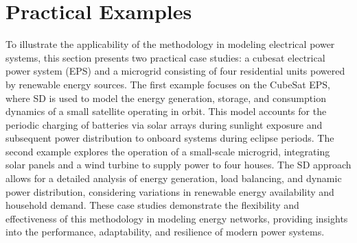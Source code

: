 \documentclass[11pt, a4paper]{article}
\theoremstyle{definition}
\theoremstyle{plain}
\theoremstyle{plain}
\theoremstyle{remark}
\theoremstyle{remark}
\theoremstyle{remark}
\begin{document}
\section{Practical Examples}

To illustrate the applicability of the methodology in modeling electrical power systems, this section presents two practical case studies: a cubesat electrical power system (EPS) and a microgrid consisting of four residential units powered by renewable energy sources. The first example focuses on the CubeSat EPS, where SD is used to model the energy generation, storage, and consumption dynamics of a small satellite operating in orbit. This model accounts for the periodic charging of batteries via solar arrays during sunlight exposure and subsequent power distribution to onboard systems during eclipse periods. The second example explores the operation of a small-scale microgrid, integrating solar panels and a wind turbine to supply power to four houses. The SD approach allows for a detailed analysis of energy generation, load balancing, and dynamic power distribution, considering variations in renewable energy availability and household demand. These case studies demonstrate the flexibility and effectiveness of this methodology in modeling energy networks, providing insights into the performance, adaptability, and resilience of modern power systems.
\end{document}
